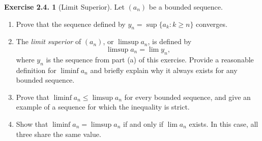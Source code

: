 \documentclass[12pt]{article}
\theoremstyle{definition}
\theoremstyle{exercise}
\newtheorem{exercise}{Exercise 2.4.}
\theoremstyle{solution}
\begin{document}
\begin{exercise}[Limit Superior]
\label{ex:7}
    Let \( (a_n) \) be a bounded sequence.
    \begin{enumerate}
        \item Prove that the sequence defined by \( y_n = \sup \{ a_k : k \geq n \} \) converges.

        \item The \textit{limit superior} of \( (a_n) \), or \( \limsup a_n \), is defined by
        \[
            \limsup a_n = \lim y_n,
        \]
        where \( y_n \) is the sequence from part (a) of this exercise. Provide a reasonable definition for \( \liminf a_n \) and briefly explain why it always exists for any bounded sequence.

        \item Prove that \( \liminf a_n \leq \limsup a_n \) for every bounded sequence, and give an example of a sequence for which the inequality is strict.

        \item Show that \( \liminf a_n = \limsup a_n \) if and only if \( \lim a_n \) exists. In this case, all three share the same value.
    \end{enumerate}
\end{exercise}
\end{document}
